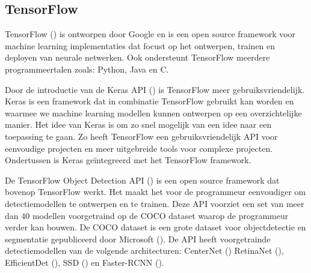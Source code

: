 \subsection{TensorFlow}
TensorFlow (\cite{abadi_tensorflow_2016}) is ontworpen door Google en is een open source framework voor machine learning implementaties dat focust op het ontwerpen, trainen en deployen van neurale netwerken.
Ook ondersteunt TensorFlow meerdere programmeertalen zoals: Python, Java en C.

Door de introductie van de Keras API (\cite{chollet2015keras}) is TensorFlow meer gebruiksvriendelijk.
Keras is een framework dat in combinatie TensorFlow gebruikt kan worden en waarmee we machine learning modellen kunnen ontwerpen op een overzichtelijke manier.
Het idee van Keras is om zo snel mogelijk van een idee naar een toepassing te gaan.
Zo heeft TensorFlow een gebruiksvriendelijk API voor eenvoudige projecten en meer uitgebreide tools voor complexe projecten.
Ondertussen is Keras ge\"integreerd met het TensorFlow framework.


De TensorFlow Object Detection API (\cite{tensorflow2015-whitepaper}) is een open source framework dat bovenop TensorFlow werkt. 
Het maakt het voor de programmeur eenvoudiger om detectiemodellen te ontwerpen en te trainen.
Deze API voorziet een set van meer dan 40 modellen voorgetraind op de COCO dataset waarop de programmeur verder kan bouwen. 
De COCO dataset is een grote dataset voor objectdetectie en segmentatie gepubliceerd door Microsoft (\cite{lin2015microsoft}).
De API heeft voorgetrainde detectiemodellen van de volgende architecturen: CenterNet (\cite{duan_centernet_2019}) RetinaNet (\cite{lin_focal_2018}), EfficientDet (\cite{tan_efficientdet_2020}), SSD (\cite{liu_ssd_2016}) en Faster-RCNN (\cite{ren_faster_2016}).


